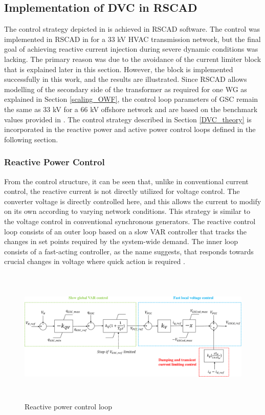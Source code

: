\subsection{Implementation of DVC in RSCAD}\label{DVC_RSCAD}
The control strategy depicted in \cite{korai_dynamic_2019} is achieved in RSCAD software. The control was implemented in RSCAD in \cite{sethi_real-time_nodate-new} for a 33 kV \gls{HVAC} transmission network, but the final goal of achieving reactive current injection during severe dynamic conditions was lacking. The primary reason was due to the avoidance of the current limiter block that is explained later in this section. However, the block is implemented successfully in this work, and the results are illustrated. 
Since RSCAD allows modelling of the secondary side of the transformer as required for one \gls{WG} as explained in Section \ref{scaling_OWF}, the control loop parameters of \gls{GSC} remain the same as 33 kV for a 66 kV offshore network and are based on the benchmark values provided in \cite{erlich_description_2018}. The control strategy described in Section \ref{DVC_theory} is incorporated in the reactive power and active power control loops defined in the following section. 

\subsubsection{Reactive Power Control}
From the control structure, it can be seen that, unlike in conventional current control, the reactive current is not directly utilized for voltage control. The converter voltage is directly controlled here, and this allows the current to modify on its own according to varying network conditions. This strategy is similar to the voltage control in conventional synchronous generators. The reactive control loop consists of an outer loop based on a slow VAR controller that tracks the changes in set points required by the system-wide demand. The inner loop consists of a fast-acting controller, as the name suggests, that responds towards crucial changes in voltage where quick action is required \cite{korai_dynamic_2019}.

\begin{figure}[H]
\centering
    \includegraphics[height = 6.5cm,width = \textwidth]{Diagrams/Chapter_3/Reactive_power_loop.pdf}
    \caption{Reactive power control loop \cite{korai_dynamic_2019}}
    \label{fig:Reactive_Power_Control_Loop}
\end{figure}

